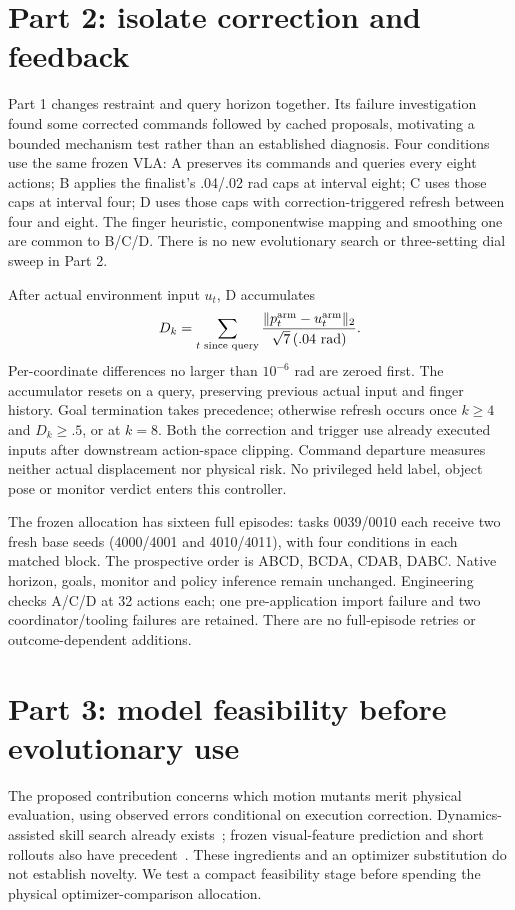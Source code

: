 \section{Part 2: isolate correction and feedback}
Part 1 changes restraint and query horizon together. Its failure investigation
found some corrected commands followed by cached proposals, motivating a bounded
mechanism test rather than an established diagnosis. Four conditions use the same
frozen VLA: A preserves its commands and queries every eight actions; B applies the
finalist's .04/.02 rad caps at interval eight; C uses those caps at interval four;
D uses those caps with correction-triggered refresh between four and eight. The
finger heuristic, componentwise mapping and smoothing one are common to B/C/D.
There is no new evolutionary search or three-setting dial sweep in Part 2.

After actual environment input $u_t$, D accumulates
\begin{equation}
 D_k=\sum_{t\text{ since query}}
 \frac{\|p_t^{\rm arm}-u_t^{\rm arm}\|_2}{\sqrt7\,(.04\text{ rad})}.
\end{equation}
Per-coordinate differences no larger than $10^{-6}$ rad are zeroed first. The
accumulator resets on a query, preserving previous actual input and finger history.
Goal termination takes precedence; otherwise refresh occurs once $k\ge4$ and
$D_k\ge.5$, or at $k=8$. Both the correction and trigger use already executed
inputs after downstream action-space clipping. Command departure measures neither
actual displacement nor physical risk. No privileged held label, object pose or
monitor verdict enters this controller.

The frozen allocation has sixteen full episodes: tasks 0039/0010 each receive two
fresh base seeds (4000/4001 and 4010/4011), with four conditions in each matched block.
The prospective order is ABCD, BCDA, CDAB, DABC. Native horizon, goals, monitor and
policy inference remain unchanged. Engineering checks A/C/D at 32 actions each;
one pre-application import failure and two coordinator/tooling failures are retained.
There are no full-episode retries or outcome-dependent additions.



\section{Part 3: model feasibility before evolutionary use}
The proposed contribution concerns which motion mutants merit physical evaluation,
using observed errors conditional on execution correction. Dynamics-assisted
skill search already exists~\cite{daqd}; frozen visual-feature prediction and short
rollouts also have precedent~\cite{dinowm,mbpo}. These ingredients and an optimizer
substitution do not establish novelty. We test a compact feasibility stage before
spending the physical optimizer-comparison allocation.

